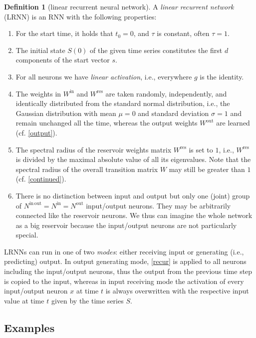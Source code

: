 \documentclass[twoside,11pt]{article}
\theoremstyle{definition}
\newtheorem{defn}{Definition}
\begin{document}
\begin{defn}[linear recurrent neural network]\label{thedef}
A \emph{linear recurrent network} (LRNN) is an RNN with the
following properties:
\begin{enumerate}
  \item For the start time, it holds that $t_0=0$, and $\tau$ is constant, often $\tau=1$.
  \item The initial state $S(0)$ of the given time series constitutes the first
	$d$ components of the start vector $s$.
  \item For all neurons we have \emph{linear activation}, i.e., everywhere $g$
	is the identity.
  \item The weights in $W^\mathrm{in}$ and $W^\mathrm{res}$ are taken
	randomly, independently, and identically distributed from the standard
	normal distribution, i.e., the Gaussian distribution with mean $\mu = 0$
	and standard deviation $\sigma = 1$ and remain unchanged all the time, whereas the output weights
	$W^\mathrm{out}$ are learned (cf. \cref{output}).
  \item The spectral radius of the reservoir weights matrix $W^\mathrm{res}$ is
	set to $1$, i.e., $W^\mathrm{res}$ is divided by the maximal absolute
	value of all its eigenvalues. Note that the spectral radius of the
	overall transition matrix $W$ may still be greater than $1$ (cf. \cref{continued}).
  \item There is no distinction between input and output but only one (joint)
	group of $N^\mathrm{in\,out} = N^\mathrm{in}=N^\mathrm{out}$ input/output neurons. They may
	be arbitrarily connected like the reservoir neurons. We thus can imagine
	the whole network as a big reservoir because the input/output neurons
	are not particularly special.
\end{enumerate}
\end{defn}

LRNNs can run in one of two \emph{modes}: either receiving input or generating
(i.e., predicting) output. In output generating mode, \cref{recur} is applied to
all neurons including the input/output neurons, thus the output from the
previous time step is copied to the input, whereas in input receiving mode
the activation of every input/output neuron $x$ at time $t$ is always
overwritten with the respective input value at time $t$ given by the time series
$S$.

\subsection{Examples}
\end{document}
